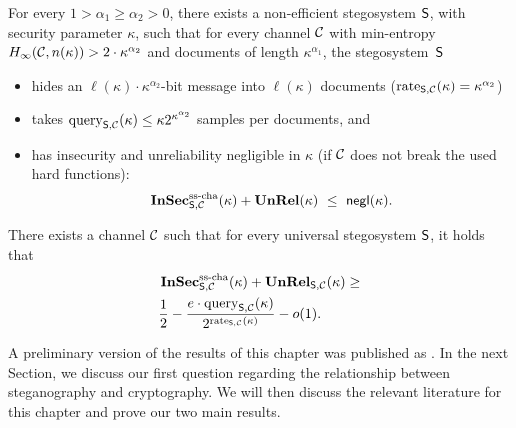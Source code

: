 \begin{theorem}[Informal]\label{th:main:existexp}
For every $1>\alpha_{1}\geq \alpha_{2}>0$,
there exists a non-efficient stegosystem $\operatorname{\mathsf{S}}$, with security parameter $\kappa$, 
such that for every channel $\mathcal{C}$ with
min-entropy $H_{\infty}(\mathcal{C},n(\kappa))> 2\cdot
\kappa^{\alpha_{2}}$ and documents of length $\kappa^{\alpha_{1}}$,
 the stegosystem~$\operatorname{\mathsf{S}}$ 
\begin{itemize}
\item  hides an $\ell(\kappa) \cdot \kappa^{\alpha_{2}}$-bit message
  into $\ell(\kappa)$ documents ($\operatorname{rate}_{\operatorname{\mathsf{S}},\mathcal{C}}(\kappa)=\kappa^{\alpha_{2}}$)
\item 
  takes $\operatorname{query}_{\operatorname{\mathsf{S}},\mathcal{C}}(\kappa)\le \kappa 2^{\kappa^{\alpha_{2}}} $ samples per documents, and 
\item 
 has insecurity and  unreliability negligible in $\kappa$ 
 (if $\mathcal{C}$ does  not break the used hard functions):
  \begin{align*}
  \operatorname{\mathbf{InSec}}_{\operatorname{\mathsf{S}},\mathcal{C}}^{\operatorname{ss-cha}}(\kappa) + \operatorname{\mathbf{UnRel}}(\kappa) \ \le \  \operatorname{\mathsf{negl}}(\kappa). 
  \end{align*}
\end{itemize}
\end{theorem}

\begin{theorem}[Informal]\label{th:main:lower:bound}
  There exists  a  channel $\mathcal{C}$ such that for every universal 
  stegosystem $\operatorname{\mathsf{S}}$, it holds that
  \begin{align*} 
    &\operatorname{\mathbf{InSec}}_{\operatorname{\mathsf{S}},\mathcal{C}}^{\operatorname{ss-cha}}(\kappa) + \operatorname{\mathbf{UnRel}}_{\operatorname{\mathsf{S}},\mathcal{C}}(\kappa) \ge  \\
    &\frac{1}{2}-  \frac{e\cdot \operatorname{query}_{\operatorname{\mathsf{S}},\mathcal{C}}(\kappa)}{2^{\operatorname{rate}_{\operatorname{\mathsf{S}},\mathcal{C}}(\kappa)}}  -o(1).
  \end{align*}
\end{theorem}



A preliminary version of the results of this chapter was published as
\cite{berndt2016optimal}. In the next Section, we discuss our first
question regarding the relationship between steganography and
cryptography. We will then discuss the relevant literature for this
chapter and prove our two main results.


